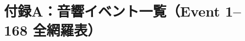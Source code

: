 \clearpage
\onecolumn

\section*{付録A：音響イベント一覧（Event 1–168 全網羅表）}
\label{app:all-events}


\newcommand{\EventRow}[7]{#1 & #2 & #3 & #4 & #5 & #6 & #7\\}

\setlength{\LTpre}{0pt}
\setlength{\LTpost}{0pt}
\renewcommand{\arraystretch}{1.15}

\scriptsize

